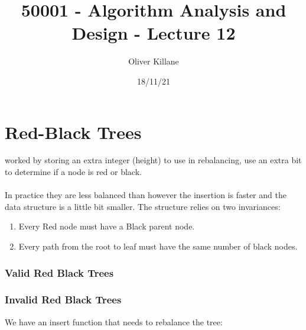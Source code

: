 \documentclass{report}
\title{50001 - Algorithm Analysis and Design - Lecture 12}
\author{Oliver Killane}
\date{18/11/21}
\begin{document}
    \maketitle

    \section*{Red-Black Trees}
         worked by storing an extra integer (height) to use in rebalancing,  use an extra bit to determine if a node is red or black.
        \\
        \\ In practice they are less balanced than  however the insertion is faster and the data structure is a little bit smaller.
        The structure relies on two invariances:
        \begin{enumerate}
            \item Every Red node must have a Black parent node.
            \item Every path from the root to leaf must have the same number of black nodes.
        \end{enumerate}
        \subsubsection*{Valid Red Black Trees}
        \subsubsection*{Invalid Red Black Trees}
        We have an insert function that needs to rebalance the tree:
    
\end{document}
